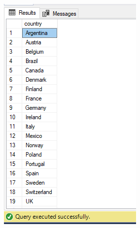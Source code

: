 \documentclass[12pt,titlepage]{article}
\begin{document}
\begin{enumerate}
    \includegraphics[height=.8\textheight]{images/figures/fig2.png}
    \newpage

\end{enumerate}
\end{document}
